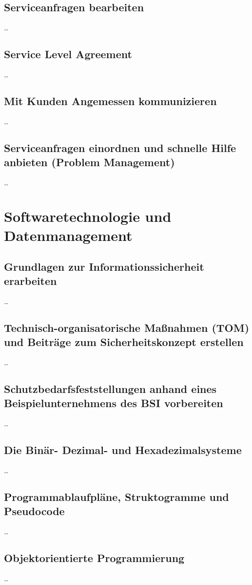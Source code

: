 \documentclass[a4paper, 12pt]{report}
\begin{document}
\section{Serviceanfragen bearbeiten}
\dots

\section{Service Level Agreement}
\dots

\section{Mit Kunden Angemessen kommunizieren}
\dots

\section{Serviceanfragen einordnen und schnelle Hilfe anbieten (Problem Management)}
\dots


\chapter{Softwaretechnologie und Datenmanagement}

\section{Grundlagen zur Informationssicherheit erarbeiten}
\dots

\section{Technisch-organisatorische Maßnahmen (TOM) und Beiträge zum Sicherheitskonzept erstellen}
\dots

\section{Schutzbedarfsfeststellungen anhand eines Beispielunternehmens des BSI vorbereiten}
\dots

\section{Die Binär- Dezimal- und Hexadezimalsysteme}
\dots

\section{Programmablaufpläne, Struktogramme und Pseudocode}
\dots

\section{Objektorientierte Programmierung}
\dots
\end{document}

